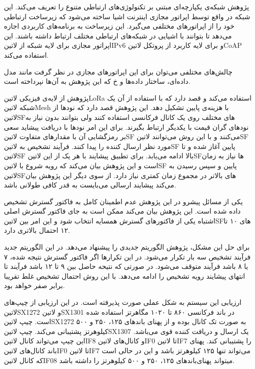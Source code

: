 
پژوهش  شبکه‌ی یکپارچه‌ای مبتنی بر تکنولوژی‌های ارتباطی متنوع را تعریف می‌کند. این شبکه در واقع توسط اپراتور مجازی اینترنت اشیا
ساخته می‌شود که زیرساخت ارتباطی خود را از اپراتورهای مختلفی می‌گیرد. این زیرساخت به برنامه‌های کاربردی اجازه می‌دهد تا بتوانند با اشیایی در شبکه‌های ارتباطی مختلف ارتباط داشته باشند.
این اپراتور مجازی برای لایه شبکه از ‌لاتین{IPv6} و برای لایه کاربرد از پروتکل ‌لاتین{CoAP} استفاده می‌کند.

چالش‌های مختلفی می‌توان برای این اپراتورهای مجازی در نظر گرفت مانند مدل داده‌ای، ساختار داده‌ها و ‌خ که این پژوهش به آن‌ها نپرداخته است.


پژوهش  از لایه‌ی فیزیکی ‌لاتین{LoRa} استفاده می‌کند و قصد دارد که با استفاده از آن یک شبکه ‌لاتین{Mesh} با هزینه‌ی پایین تشکیل دهد.
این پژوهش قصد دارد که نودها از ‌لاتین{SF}های مختلف روی یک کانال فرکانسی استفاده کنند ولی بتوانند بدون نیاز به نودهای گران قیمت با یکدیگر ارتباط بگیرند.
برای این امر نودها با دریافت پیشاید سعی بر رمزگشایی آن با مقدارهای متفاوت ‌لاتین{SF} می‌کنند و با این روش می‌توانند ‌لاتین{SF} مورد نظر ارسال کننده را پیدا کنند.
فرآیند تشخیص به ‌لاتین{SF} پایین آغاز شده و تا ‌لاتین{SF} بالا ادامه می‌یابد. برای تطبیق پیشایند با هر یک از این ‌لاتین{SF}ها نیاز به زمان است
و این پژوهش بیان می‌کند که رویه شروع با ‌لاتین{SF} پایین و سپس رسیدن به ‌لاتین{SF}های بالاتر در مجموع زمان کمتری نیاز دارد.
از سوی دیگر این پژوهش بیان می‌کند پیشایند ارسالی می‌بایست به قدر کافی طولانی باشد.

یکی از مسائل پیشرو در این پژوهش عدم اطمینان کامل به فاکتور گسترش تشخیص داده شده است.
این پژوهش بیان می‌کند ممکن است به جای فاکتور گسترش اصلی اشتباه یکی از فاکتورهای گسترش همسایه انتخاب شود و
این امر بین ‌لاتین{SF}های ۱۰ تا ۱۲ احتمال بالاتری دارد.

برای حل این مشکل، پژوهش الگوریتم جدیدی را پیشنهاد می‌دهد. در این الگوریتم جدید فرآیند تشخیص سه بار تکرار می‌شود.
در این تکرارها اگر فاکتور گسترش نتیجه شده، ۷ یا ۸ باشد فرآیند متوقف می‌شود.
در صورتی که نتیحه حاصل بین ۹ تا ۱۲ باشد فرآیند تا انتهای پیشایند رویه تشخیص را ادامه می‌دهد.
با این روش احتمال تشخیص غلط تقریبا برابر صفر خواهد بود.

ارزیابی این سیستم به شکل عملی صورت پذیرفته است. در این ارزیابی از چیپ‌های ‌لاتین{SX1272} و ‌لاتین{SX1301} در باند فرکانسی ۸۶۰ تا ۱۰۲۰ مگاهرتز استفاده شده است.
چیپ ‌لاتین{SX1272} به صورت تک کانال بوده و از پهنای باندهای ۱۲۵، ۲۵۰ و ۵۰۰ کیلوهرتز پشتیبانی می‌کند.
چیپ ‌لاتین{SX1307} یک ارسال و دریافت کننده قوی می‌باشد. این چیپ می‌تواند کانال ‌لاتین{IF8} و کانال‌های ‌لاتین{IF0} تا ‌لاتین{IF7} را پشتیبانی کند.
پهنای باند کانال‌های ‌لاتین{IF0} تا ‌لاتین{IF7} می‌تواند تنها ۱۲۵ کیلوهرتز باشد و این در حالی است که کانال ‌لاتین{IF08} میتواند پهنای‌باندهای ۱۲۵، ۲۵۰ و ۵۰۰ کیلوهرتز را داشته باشد.

